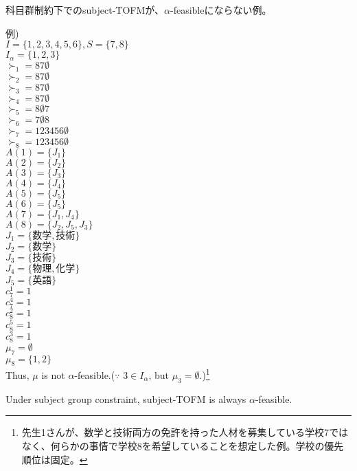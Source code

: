 \documentclass[a4j,10pt]{jsarticle}
\theoremstyle{definition}
\theoremstyle{remark}
\theoremstyle{plain}
\begin{document}
\begin{tcolorbox}
  科目群制約下でのsubject-TOFMが、$\alpha$-feasibleにならない例。

例)\\
$I = \{1,2,3,4,5,6\}, S = \{7,8\}$\\
$I_\alpha = \{1,2,3\}$\\
$\succ_1 = 87\emptyset$\\
$\succ_2 = 87\emptyset$\\
$\succ_3 = 87\emptyset$\\

$\succ_4 = 87\emptyset$\\
$\succ_5 = 8\emptyset 7$\\
$\succ_6 = 7\emptyset 8$\\

$\succ_7 = 123456\emptyset$\\
$\succ_8 = 123456\emptyset$\\

$A(1) = \{J_1\}$\\
$A(2) = \{J_2\}$\\
$A(3) = \{J_3\}$\\
$A(4) = \{J_4\}$\\
$A(5) = \{J_5\}$\\
$A(6) = \{J_5\}$\\

$A(7) = \{J_1,J_4\}$\\
$A(8) = \{J_2,J_5,J_3\}$\\

$J_1 = \{数学,技術\}$\\
$J_2 = \{数学\}$\\
$J_3 = \{技術\}$\\
$J_4 = \{物理,化学\}$\\
$J_5 = \{英語\}$\\

$c^1_7 = 1$\\
$c^4_7 = 1$\\
$c^2_8 = 1$\\
$c^5_8 = 1$\\
$c^3_8 = 1$\\

$\mu_7 = \emptyset$\\
$\mu_8 = \{1,2\}$\\

Thus, $\mu$ is not $\alpha$-feasible.($\because$ $3 \in I_\alpha$, but $\mu_3 = \emptyset$.)\footnote{先生1さんが、数学と技術両方の免許を持った人材を募集している学校7ではなく、何らかの事情で学校8を希望していることを想定した例。学校の優先順位は固定。}\\





\end{tcolorbox}

\begin{tcolorbox}
  Under subject group constraint, subject-TOFM is always $\alpha$-feasible.
\end{tcolorbox}
\end{document}
